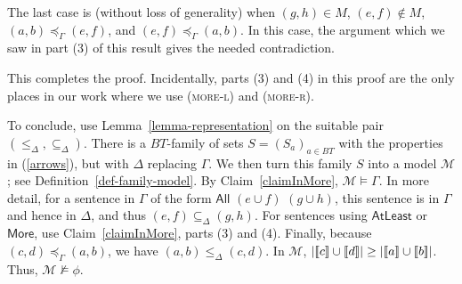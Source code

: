 \documentclass[letterpaper]{article} %
\theoremstyle{definition}
\newcommand{\semantics}[1]{[\![\mbox{\em $ #1 $\/}]\!]}
\newcommand{\Model}{\mathcal{M}}
\newcommand{\proverule}{\textsc}
\newcommand{\morel}{\proverule{more-l}}
\newcommand{\morer}{\proverule{more-r}}
\newcommand{\All}[2]{\mathsf{All}\,\,#1\,\,#2}
\newcommand{\AtleastNoArgs}{\mathsf{AtLeast}}
\newcommand{\MoreNoArgs}{\mathsf{More}}
\newcommand{\provsubDelta}{\subseteq_{\Delta}}
\newcommand{\provleDelta}{\le_{\Delta}}
\newcommand{\provextended}{\preceq_{\Gamma}}
\begin{document}
{{\begin{enumerate}
The last case is  (without loss of generality) 
when $(g,h)\in M$, $(e,f)\notin M$, $(a,b) \provextended (e,f)$, and $(e,f) \provextended (a,b)$.
In this case, the argument which we saw in part (3) of this result gives the needed contradiction.

\end{enumerate}
This completes the proof. 
Incidentally, parts (3) and (4) in  this proof are the only places in our work where we use (\morel) and (\morer).
  }


  
To conclude,  use Lemma~\ref{lemma-representation} on the suitable pair $(\provleDelta,\provsubDelta)$.
There is a $BT$-family of sets $S= (S_a)_{a\in BT}$ with the properties in (\ref{arrows}), but 
with $\Delta$ replacing $\Gamma$.  We then turn this family $S$ into a model $\Model$; see Definition~\ref{def-family-model}.
By  Claim~\ref{claimInMore}, $\Model\models\Gamma$.
In more detail, for a sentence in $\Gamma$ of the form $\All{(e\cup f)}{(g\cup h)}$, this sentence is in $\Gamma$
and hence in $\Delta$, and thus $(e,f) \provsubDelta (g,h)$.   
For sentences using $\AtleastNoArgs$ or $\MoreNoArgs$,  use Claim~\ref{claimInMore}, parts (3) and (4).
Finally, 
because $(c,d) \provextended (a,b)$, we have $(a,b) \provleDelta (c,d)$.  In $\Model$, $|\semantics{c} \cup \semantics{d}| \geq
|\semantics{a} \cup \semantics{b}|$.
Thus,  $\Model\not\models\phi$.
}
\end{document}

